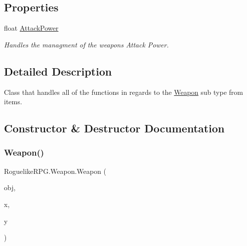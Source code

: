 \subsection*{Properties}
\begin{DoxyCompactItemize}
\item 
float \mbox{\hyperlink{class_roguelike_r_p_g_1_1_weapon_a68ffbf4b9ebe1e99d879c18021dba80b}{Attack\+Power}}
\begin{DoxyCompactList}\small\item\em Handles the managment of the weapon\textquotesingle{}s Attack Power. \end{DoxyCompactList}\end{DoxyCompactItemize}


\subsection{Detailed Description}
Class that handles all of the functions in regards to the \mbox{\hyperlink{class_roguelike_r_p_g_1_1_weapon}{Weapon}} sub type from items. 



\subsection{Constructor \& Destructor Documentation}
\mbox{\label{class_roguelike_r_p_g_1_1_weapon_a150f41f8b59b68c93eba9b01efa812b9}} 
\subsubsection{\texorpdfstring{Weapon()}{Weapon()}}
{\footnotesize\ttfamily Roguelike\+R\+P\+G.\+Weapon.\+Weapon (\begin{DoxyParamCaption}\item[{\mbox{\hyperlink{struct_roguelike_r_p_g_1_1_object_data}{Object\+Data}}}]{obj,  }\item[{int}]{x,  }\item[{int}]{y }\end{DoxyParamCaption})\hspace{0.3cm}{\ttfamily [inline]}}



